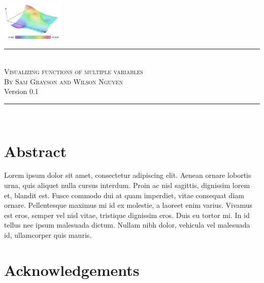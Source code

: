 \documentclass[12pt,letterpaper,english]{article}
\begin{document}
\begin{titlepage}
\thispagestyle{plain}
\begin{center}
\vspace*{\fill}

\includegraphics[width=3cm]{logo.png}~\\[1cm]

\rule{\linewidth}{0.5mm}\\[0.5cm]

\textsc{\LARGE Visualizing functions of multiple variables}\\[1cm]

\textsc{\large By Sam Grayson and Wilson Nguyen}\\[0.7cm]

{\large \isodate Version 0.1} \\[0.7cm]

\rule{\linewidth}{0.5mm}\\[1cm]

\vspace{0.9cm}

\end{center}

\section*{Abstract}

Lorem ipsum dolor sit amet, consectetur adipiscing elit. Aenean ornare lobortis urna, quis aliquet nulla cursus interdum. Proin ac nisl sagittis, dignissim lorem et, blandit est. Fusce commodo dui at quam imperdiet, vitae consequat diam ornare. Pellentesque maximus mi id ex molestie, a laoreet enim varius. Vivamus est eros, semper vel nisl vitae, tristique dignissim eros. Duis eu tortor mi. In id tellus nec ipsum malesuada dictum. Nullam nibh dolor, vehicula vel malesuada id, ullamcorper quis mauris.

\vspace*{\fill}

\end{titlepage}

\section*{Acknowledgements}
\end{document}
